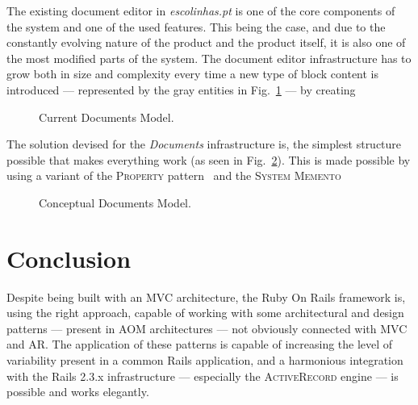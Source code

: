 \documentclass[9pt,a4paper]{extarticle}
\begin{document}
\begin{multicols}{2}
The existing document editor in \emph{escolinhas.pt} is one of the core components of the system and one of the used features. This being the case, and due to the constantly evolving nature of the product and the product itself, it is also one of the most modified parts of the system. The document editor infrastructure has to grow both in size and complexity every time a new type of block content is introduced --- represented by the gray entities in Fig.~\ref{fig:documents_current} --- by creating 

\begin{figure}[H]
  \caption{Current Documents Model.}
  \label{fig:documents_current}
\end{figure}

The solution devised for the \emph{Documents} infrastructure is, the simplest structure possible that makes everything work (as seen in Fig.~\ref{fig:documents_conceptual}). This is made possible by using a variant of the \textsc{Property} pattern~\cite{metadata_and_active_object_models} and the \textsc{System Memento}~\cite{patterns_data_and_metadata_evolution_in_aoms}

\begin{figure}[H]
  \caption{Conceptual Documents Model.}
  \label{fig:documents_conceptual}
\end{figure}

\section{Conclusion}\label{sec:conclusion}

Despite being built with an MVC architecture, the Ruby On Rails framework is, using the right approach, capable of working with some architectural and design patterns --- present in AOM architectures --- not obviously connected with MVC and AR. The application of these patterns is capable of increasing the level of variability present in a common Rails application, and a harmonious integration with the Rails 2.3.x infrastructure --- especially the \textsc{ActiveRecord} engine --- is possible and works elegantly.


\end{multicols}
\end{document}
